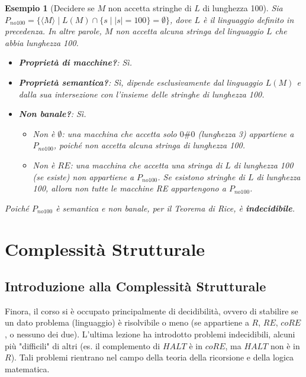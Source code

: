 \documentclass[a4paper, 11pt]{book} %
\newtheorem{example}[theorem]{Esempio}
\theoremstyle{definition}
\begin{document}
\begin{example}[Decidere se $M$ non accetta stringhe di $L$ di lunghezza 100]
Sia $P_{no100} = \{\langle M \rangle \mid L(M) \cap \{s \mid |s|=100\} = \emptyset\}$, dove $L$ è il linguaggio definito in precedenza. In altre parole, $M$ non accetta alcuna stringa del linguaggio $L$ che abbia lunghezza 100.
\begin{itemize}
    \item \textbf{Proprietà di macchine?}: Sì.
    \item \textbf{Proprietà semantica?}: Sì, dipende esclusivamente dal linguaggio $L(M)$ e dalla sua intersezione con l'insieme delle stringhe di lunghezza 100.
    \item \textbf{Non banale?}: Sì.
    \begin{itemize}
        \item Non è $\emptyset$: una macchina che accetta solo $0\#0$ (lunghezza 3) appartiene a $P_{no100}$, poiché non accetta alcuna stringa di lunghezza 100.
        \item Non è $RE$: una macchina che accetta una stringa di $L$ di lunghezza 100 (se esiste) non appartiene a $P_{no100}$. Se esistono stringhe di $L$ di lunghezza 100, allora non tutte le macchine RE appartengono a $P_{no100}$.
    \end{itemize}
\end{itemize}
Poiché $P_{no100}$ è semantica e non banale, per il Teorema di Rice, è \textbf{indecidibile}.
\end{example}



\chapter{Complessità Strutturale}



\section{Introduzione alla Complessità Strutturale}

Finora, il corso si è occupato principalmente di decidibilità, ovvero di stabilire se un dato problema (linguaggio) è risolvibile o meno (se appartiene a $R$, $RE$, $coRE$, o nessuno dei due).
L'ultima lezione ha introdotto problemi indecidibili, alcuni più "difficili" di altri (es. il complemento di $HALT$ è in $coRE$, ma $HALT$ non è in $R$). Tali problemi rientrano nel campo della teoria della ricorsione e della logica matematica.
\end{document}
